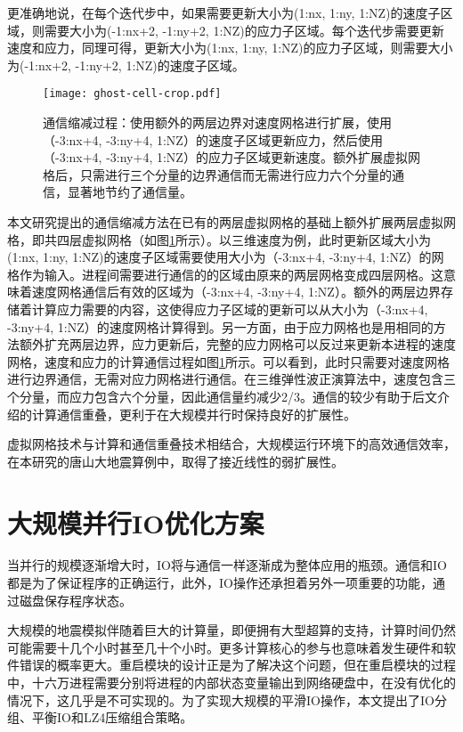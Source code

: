 更准确地说，在每个迭代步中，如果需要更新大小为(1:nx, 1:ny, 1:NZ)的速度子区域，则需要大小为(-1:nx+2, -1:ny+2, 1:NZ)的应力子区域。每个迭代步需要更新速度和应力，同理可得，更新大小为(1:nx, 1:ny, 1:NZ)的应力子区域，则需要大小为(-1:nx+2, -1:ny+2, 1:NZ)的速度子区域。

\begin{figure}[ht]
  \centering
  \texttt{[image: ghost-cell-crop.pdf]}
  \caption{通信缩减过程：使用额外的两层边界对速度网格进行扩展，使用（-3:nx+4, -3:ny+4, 1:NZ）的速度子区域更新应力，然后使用（-3:nx+4, -3:ny+4, 1:NZ）的应力子区域更新速度。额外扩展虚拟网格后，只需进行三个分量的边界通信而无需进行应力六个分量的通信，显著地节约了通信量。}
  \label{fig:ghost-cell}
\end{figure}

本文研究提出的通信缩减方法在已有的两层虚拟网格的基础上额外扩展两层虚拟网格，即共四层虚拟网格（如图\ref{fig:ghost-cell}所示）。以三维速度为例，此时更新区域大小为(1:nx, 1:ny, 1:NZ)的速度子区域需要使用大小为（-3:nx+4, -3:ny+4, 1:NZ）的网格作为输入。进程间需要进行通信的的区域由原来的两层网格变成四层网格。这意味着速度网格通信后有效的区域为（-3:nx+4, -3:ny+4, 1:NZ）。额外的两层边界存储着计算应力需要的内容，这使得应力子区域的更新可以从大小为（-3:nx+4, -3:ny+4, 1:NZ）的速度网格计算得到。另一方面，由于应力网格也是用相同的方法额外扩充两层边界，应力更新后，完整的应力网格可以反过来更新本进程的速度网格，速度和应力的计算通信过程如图\ref{fig:ghost-cell}所示。可以看到，此时只需要对速度网格进行边界通信，无需对应力网格进行通信。在三维弹性波正演算法中，速度包含三个分量，而应力包含六个分量，因此通信量约减少2/3。通信的较少有助于后文介绍的计算通信重叠，更利于在大规模并行时保持良好的扩展性。

虚拟网格技术与计算和通信重叠技术相结合，大规模运行环境下的高效通信效率，在本研究的唐山大地震算例中，取得了接近线性的弱扩展性。

\section{大规模并行IO优化方案}

当并行的规模逐渐增大时，IO将与通信一样逐渐成为整体应用的瓶颈。通信和IO都是为了保证程序的正确运行，此外，IO操作还承担着另外一项重要的功能，通过磁盘保存程序状态。

大规模的地震模拟伴随着巨大的计算量，即便拥有大型超算的支持，计算时间仍然可能需要十几个小时甚至几十个小时。更多计算核心的参与也意味着发生硬件和软件错误的概率更大。重启模块的设计正是为了解决这个问题，但在重启模块的过程中，十六万进程需要分别将进程的内部状态变量输出到网络硬盘中，在没有优化的情况下，这几乎是不可实现的。为了实现大规模的平滑IO操作，本文提出了IO分组、平衡IO和LZ4压缩组合策略。

